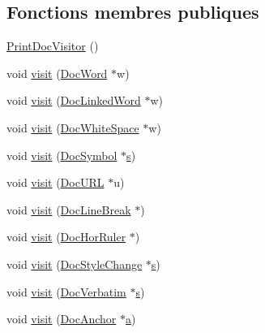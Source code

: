 \subsection*{Fonctions membres publiques}
\begin{DoxyCompactItemize}
\item 
\hyperlink{class_print_doc_visitor_a67435323587e5a301e8839b42c2112f2}{Print\+Doc\+Visitor} ()
\item 
void \hyperlink{class_print_doc_visitor_a9e08f25ea218e952d9e30df76ed45644}{visit} (\hyperlink{class_doc_word}{Doc\+Word} $\ast$w)
\item 
void \hyperlink{class_print_doc_visitor_ade17fe7412bbcd5f17f7e117688d9ac7}{visit} (\hyperlink{class_doc_linked_word}{Doc\+Linked\+Word} $\ast$w)
\item 
void \hyperlink{class_print_doc_visitor_a7ae3f66d383b586f176801d16bb90c06}{visit} (\hyperlink{class_doc_white_space}{Doc\+White\+Space} $\ast$w)
\item 
void \hyperlink{class_print_doc_visitor_a7c427480a4a0d63d646d30ef93dd8a39}{visit} (\hyperlink{class_doc_symbol}{Doc\+Symbol} $\ast$\hyperlink{060__command__switch_8tcl_a011c73f2dbb87635a3b4206c72355f6e}{s})
\item 
void \hyperlink{class_print_doc_visitor_a3848fd621beeafc4ea13c12df621e211}{visit} (\hyperlink{class_doc_u_r_l}{Doc\+U\+R\+L} $\ast$u)
\item 
void \hyperlink{class_print_doc_visitor_ac39bbf5e00bf983fa120072903cfe163}{visit} (\hyperlink{class_doc_line_break}{Doc\+Line\+Break} $\ast$)
\item 
void \hyperlink{class_print_doc_visitor_a029adfecf06601197345cff139fffedd}{visit} (\hyperlink{class_doc_hor_ruler}{Doc\+Hor\+Ruler} $\ast$)
\item 
void \hyperlink{class_print_doc_visitor_abfab432d5fd4180305807012e533ca96}{visit} (\hyperlink{class_doc_style_change}{Doc\+Style\+Change} $\ast$\hyperlink{060__command__switch_8tcl_a011c73f2dbb87635a3b4206c72355f6e}{s})
\item 
void \hyperlink{class_print_doc_visitor_ae369c09db28671f50fb909f4a25c1145}{visit} (\hyperlink{class_doc_verbatim}{Doc\+Verbatim} $\ast$\hyperlink{060__command__switch_8tcl_a011c73f2dbb87635a3b4206c72355f6e}{s})
\item 
void \hyperlink{class_print_doc_visitor_a2e58b7d35da3bd9cfc0bf0d6d924f43a}{visit} (\hyperlink{class_doc_anchor}{Doc\+Anchor} $\ast$\hyperlink{060__command__switch_8tcl_ab08ae027fc5777bc4f0629f1b60b35db}{a})
\item 

\end{DoxyCompactItemize}
